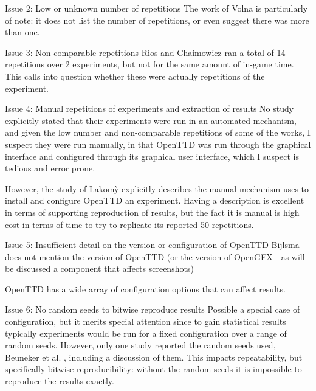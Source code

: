 \documentclass[logo,msc,dsti]{style/infthesis}    %
\begin{document}
{\begin{itemize}
\begin{descitem}{Issue 2: Low or unknown number of repetitions}
The work of Volna \cite{volna2017fuzzy} is particularly of note: it does not list the number of repetitions, or even suggest there was more than one.
\end{descitem}
\begin{descitem}{Issue 3: Non-comparable repetitions}
Rios and Chaimowicz \cite{rios2009trains} ran a total of 14 repetitions over 2 experiments, but not for the same amount of in-game time. This calls into question whether these were actually repetitions of the experiment.
\end{descitem}
\begin{descitem}{Issue 4: Manual repetitions of experiments and extraction of results}
No study explicitly stated that their experiments were run in an automated mechanism, and given the low number and non-comparable repetitions of some of the works, I suspect they were run manually, in that OpenTTD was run through the graphical interface and configured through its graphical user interface, which I suspect is tedious and error prone.

However, the study of {Lakom{\`y}} \cite{lakomy2020railroad} explicitly describes the manual mechanism uses to install and configure OpenTTD an experiment. Having a description is excellent in terms of supporting reproduction of results, but the fact it is manual is high cost in terms of time to try to replicate its reported 50 repetitions.
\end{descitem}

\begin{descitem}{Issue 5: Insufficient detail on the version or configuration of OpenTTD}
Bijlsma \cite{bijlsma2014evolving} does not mention the version of OpenTTD (or the version of OpenGFX - as will be discussed a component that affects screenshots)

OpenTTD has a wide array of configuration options that can affect results.
\end{descitem}
\begin{descitem}{Issue 6: No random seeds to bitwise reproduce results}
Possible a special case of configuration, but it merits special attention since to gain statistical results typically experiments would be run for a fixed configuration over a range of random seeds. However, only one study reported the random seeds used, Beuneker et al. \cite{beuneker2019autonomous}, including a discussion of them. This impacts repeatability, but specifically bitwise reproducibility: without the random seeds it is impossible to reproduce the results exactly.
\end{descitem}


\end{itemize}}
\end{document}
